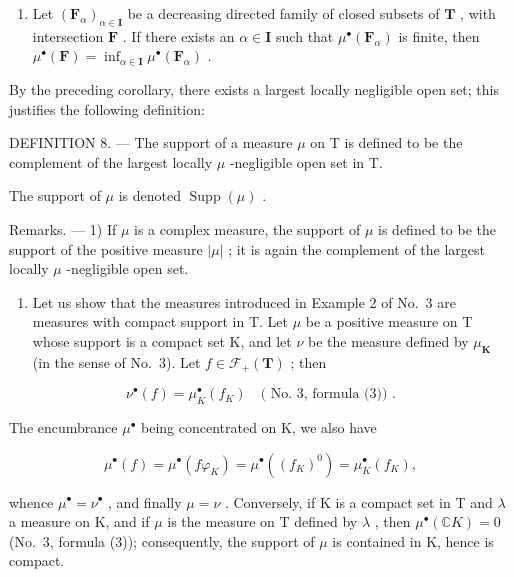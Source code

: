 \begin{enumerate}
\def\labelenumi{\alph{enumi})}
\setcounter{enumi}{1}
\tightlist
\item
  Let \((\mathbf{F}_{\alpha})_{\alpha \in \mathbf{I}}\) be a decreasing directed family of closed subsets of \(\mathbf{T}\) , with intersection \(\mathbf{F}\) . If there exists an \(\alpha \in \mathbf{I}\) such that \(\mu^{\bullet}(\mathbf{F}_{\alpha})\) is finite, then \(\mu^{\bullet}(\mathbf{F}) = \inf_{\alpha \in \mathbf{I}} \mu^{\bullet}(\mathbf{F}_{\alpha})\) .
\end{enumerate}

By the preceding corollary, there exists a largest locally negligible open set; this justifies the following definition:

DEFINITION 8. --- The support of a measure \(\mu\) on T is defined to be the complement of the largest locally \(\mu\) -negligible open set in T.

The support of \(\mu\) is denoted \(\operatorname{Supp}(\mu)\) .

Remarks. --- 1) If \(\mu\) is a complex measure, the support of \(\mu\) is defined to be the support of the positive measure \(|\mu|\) ; it is again the complement of the largest locally \(\mu\) -negligible open set.

\begin{enumerate}
\def\labelenumi{\arabic{enumi})}
\setcounter{enumi}{1}
\tightlist
\item
  Let us show that the measures introduced in Example 2 of No.~3 are measures with compact support in T. Let \(\mu\) be a positive measure on T whose support is a compact set K, and let \(\nu\) be the measure defined by \(\mu_{\mathbf{K}}\) (in the sense of No.~3). Let \(f \in \mathcal{F}_{+}(\mathbf{T})\) ; then
\end{enumerate}

\[
\nu^ {\bullet} (f) = \mu_ {K} ^ {\bullet} (f _ {K}) \quad (\text { No.   3,   formula   (3)) }.
\]

The encumbrance \(\mu^{\bullet}\) being concentrated on K, we also have

\[
\mu^ {\bullet} (f) = \mu^ {\bullet} (f \varphi_ {K}) = \mu^ {\bullet} ((f _ {K}) ^ {0}) = \mu_ {K} ^ {\bullet} (f _ {K}),
\]

whence \(\mu^{\bullet} = \nu^{\bullet}\) , and finally \(\mu = \nu\) . Conversely, if K is a compact set in T and \(\lambda\) a measure on K, and if \(\mu\) is the measure on T defined by \(\lambda\) , then \(\mu^{\bullet}(\mathbb{C}K) = 0\) (No.~3, formula (3)); consequently, the support of \(\mu\) is contained in K, hence is compact.

